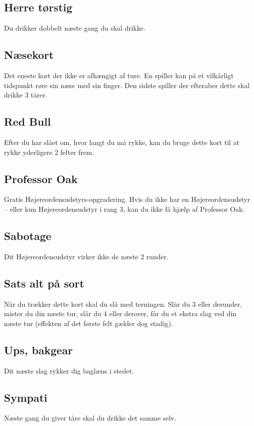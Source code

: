 \documentclass{article}
\begin{document}
\subsection{Herre tørstig}
Du drikker dobbelt næste gang du skal drikke.
 
\subsection{Næsekort} 
Det eneste kort der ikke er afhængigt af ture. En spiller kan på et vilkårligt tidspunkt røre sin næse med sin finger. Den sidste spiller der efteraber dette skal drikke 3 tårer.
 
\subsection{Red Bull} 
Efter du har slået om, hvor langt du må rykke, kan du bruge dette kort til at rykke yderligere 2 felter frem.
 
\subsection{Professor Oak} 
Gratis Højereordensudstyrs-opgradering. Hvis du ikke har en Højereordensudstyr – eller kun Højereordensudstyr i rang 3, kan du ikke få hjælp af Professor Oak.
 
\subsection{Sabotage} 
Dit Højereordensudstyr virker ikke de næste 2 runder.
 
\subsection{Sats alt på sort} 
Når du trækker dette kort skal du slå med terningen. Slår du 3 eller derunder, mister du din næste tur, slår du 4 eller derover, får du et ekstra slag ved din næste tur (effekten af det første felt gælder dog stadig). 
 
\subsection{Ups, bakgear} 
Dit næste slag rykker dig baglæns i stedet.
 
\subsection{Sympati} 
Næste gang du giver tåre skal du drikke det samme selv.
 
\end{document}
